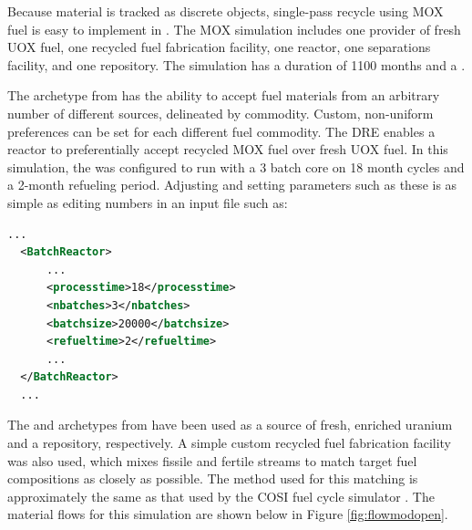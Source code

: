 Because material is tracked as discrete objects, single-pass recycle using \gls{MOX} 
fuel is easy to implement in \Cyclus.  The \gls{MOX} simulation includes one provider of fresh
\gls{UOX} fuel, one recycled fuel fabrication facility, one reactor, one separations
facility, and one repository. The simulation has a duration of 1100 months and a .

The  archetype from \Cycamore has the ability to accept
fuel materials from an arbitrary number of different sources, delineated by
commodity. Custom, non-uniform preferences can be set for each different fuel
commodity.  The \gls{DRE} enables a reactor to
preferentially accept recycled \gls{MOX} fuel over fresh \gls{UOX} fuel.  In this
simulation, the
 was configured to run with a 3 batch core on 18 month cycles and
a 2-month refueling period.  Adjusting and setting parameters such as these is
as simple as editing numbers in an input file such as:

\begin{lstlisting}[language=xml]
  ...
  <BatchReactor>
      ...
      <processtime>18</processtime>
      <nbatches>3</nbatches>
      <batchsize>20000</batchsize>
      <refueltime>2</refueltime>
      ...
  </BatchReactor>
  ...
\end{lstlisting}

The  and  archetypes from \Cycamore have been used as a
source of fresh, enriched uranium and a repository, respectively. A simple
custom recycled fuel fabrication facility was also used, which mixes fissile 
and fertile streams to match target fuel compositions as closely
as possible.  The method used for this matching is approximately the same as
that used by the \gls{COSI} fuel cycle simulator . The material flows for this simulation are shown below in Figure
\ref{fig:flowmodopen}.


